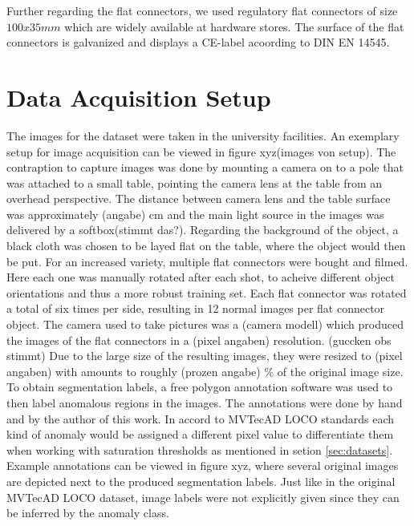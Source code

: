 Further regarding the flat connectors, we used regulatory flat connectors of size $100x35 mm$ which are widely available at hardware stores. The surface of the flat connectors is galvanized 
and displays a CE-label acoording to DIN EN 14545.




\section{Data Acquisition Setup}
\label{sec:faltconnectordataacquisiton}

The images for the dataset were taken in the university facilities. An exemplary setup for image acquisition can be viewed in figure xyz(images von setup). The contraption to capture images was 
done by mounting a camera on to a pole that was attached to a small table, pointing the camera lens at the table from an overhead perspective. The distance between camera lens and the table surface was approximately (angabe) cm and the main light source in the 
images was delivered by a softbox(stimmt das?). Regarding the background of the object, a black cloth was chosen to be layed flat on the table, where the object would then be put. For 
an increased variety, multiple flat connectors were bought and filmed. Here each one was manually rotated after each shot, to acheive different object orientations and thus a more robust training 
set. Each flat connector was rotated a total of six times per side, resulting in 12 normal images per flat connector object. \newline
The camera used to take pictures was a (camera modell) which produced the images of the flat connectors in a (pixel angaben) resolution. (guccken obs stimmt) Due to the large size of the resulting 
images, they were resized to (pixel angaben) with amounts to roughly (prozen angabe) \% of the original image size.\newline
To obtain segmentation labels, a free polygon annotation software was used to then label anomalous regions in the images. The annotations were done by hand and by the author of this work. In accord to 
MVTecAD LOCO standards \cite{LOCODentsAndScratchesBergmann2022} each kind of anomaly would be assigned a different pixel value to differentiate them when working with saturation thresholds 
as mentioned in setion \ref{sec:datasets}. Example annotations can be viewed in figure xyz, where several original images are depicted next to the produced segmentation labels. Just like in the 
original MVTecAD LOCO dataset, image labels were not explicitly given since they can be inferred by the anomaly class.


